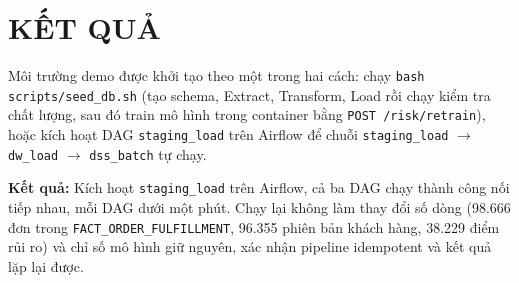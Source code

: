 \section{KẾT QUẢ}\label{sec:ket-qua}
\hspace{1cm}

Môi trường demo được khởi tạo theo một trong hai cách: chạy
\texttt{bash scripts/seed\_db.sh} (tạo schema, Extract, Transform,
Load rồi chạy kiểm tra chất lượng, sau đó train mô hình trong container bằng
\texttt{POST /risk/retrain}), hoặc kích hoạt DAG \texttt{staging\_load} trên Airflow để
chuỗi \texttt{staging\_load} $\to$ \texttt{dw\_load} $\to$ \texttt{dss\_batch} tự chạy. 

\textbf{Kết quả:} Kích hoạt \texttt{staging\_load} trên Airflow, cả ba DAG chạy thành
công nối tiếp nhau, mỗi DAG dưới một phút. Chạy lại không làm thay đổi số dòng (98.666 đơn trong
\texttt{FACT\_ORDER\_FULFILLMENT}, 96.355 phiên bản khách hàng, 38.229 điểm rủi ro) và chỉ số
mô hình giữ nguyên, xác nhận pipeline idempotent và kết quả lặp lại được.





